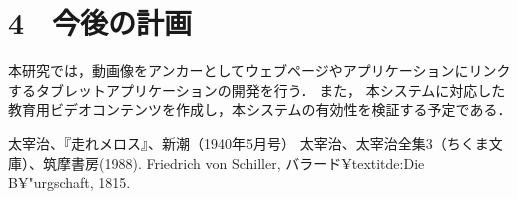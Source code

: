 \documentclass[twocolumn]{ltjsarticle}
\begin{document}
\vspace{-5mm}
\section*{4　今後の計画}
本研究では，動画像をアンカーとしてウェブページやアプリケーションにリンクするタブレットアプリケーションの開発を行う\cite{ラベル名}．
また， 本システムに対応した教育用ビデオコンテンツを作成し，本システムの有効性を検証する予定である．

\begin{thebibliography}{99}
   太宰治、『走れメロス』、新潮（1940年5月号）
   太宰治、太宰治全集3（ちくま文庫）、筑摩書房(1988).
   Friedrich von Schiller, バラード¥textit{de:Die B¥"{u}rgschaft}, 1815.
\end{thebibliography}
\end{document}
